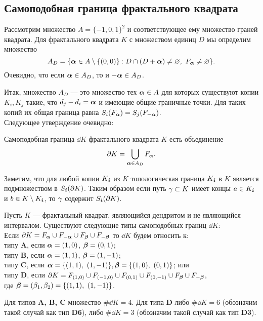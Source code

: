 \subsection{Самоподобная граница фрактального квадрата}

Рассмотрим множество $A=\{-1,0,1\}^2$ и соответствующее ему множество граней квадрата. 
Для фрактального квадрата $K$ с множеством единиц $D$ мы определим множество 
$$A_D=\{{\bm{\alpha}}\in A\setminus\{(0,0)\}: D\cap(D+{\bm{\alpha}})\neq\varnothing,\ F_{\bm{\alpha}}\neq\varnothing\}.$$ 
Очевидно, что если ${\bm{\alpha}}\in A_D$, то и $-{\bm{\alpha}}\in A_D$.

Итак, множество $A_D$ --- это множество тех ${\bm{\alpha}}\in A$ для которых существуют копии $K_i, K_j$ такие, что $d_j-d_i={\bm{\alpha}}$ и имеющие общие граничные точки. 
Для таких копий их общая граница равна $S_i(F_{\bm{\alpha}})=S_j(F_{-{\bm{\alpha}}})$.\\

Следующее утверждение очевидно:

\begin{proposition}\label{prop:dd}
Самоподобная граница $\dd K$ фрактального квадрата $K$ есть объединение
\begin{equation}
 \partial K=\bigcup\limits_{{\bm{\alpha}}\in A_D}F_{\bm{\alpha}}.
\end{equation}
\end{proposition}

Заметим, что для любой копии $K_{\bm{i}}$ из $K$ топологическая граница $K_{\bm{i}}$ в $K$ является подмножеством в 
$S_{\bm{i}}(\partial K)$. 
Таким образом если путь $\gamma\subset K$ имеет концы $a\in K_{\bm{i}}$ и $b\in K\setminus K_{\bm{i}}$, то $\gamma$ содержит $S_{\bm{i}}(\partial K)$.

\begin{theorem}\label{ssboundary}
Пусть $K$ --- фрактальный квадрат, являющийся дендритом и не являющийся интервалом. 
Существуют следующие типы самоподобных границ $\dd K$:\\
Если $\partial K=F_{\bm{\alpha}}\cup F_{-{\bm{\alpha}}}\cup F_{\bm{\beta}}\cup F_{-{\bm{\beta}}}$ то $\dd K$ будем относить к:\\
типу {\bf A}, если ${\bm{\alpha}}=(1,0)$, $ {\bm{\beta}}=(0,1)$;\\ 
типу {\bf B}, если ${\bm{\alpha}}=(1,1)$, $ {\bm{\beta}}=(1,-1)$; \\
типу {\bf C}, если $\bma=\{(1,1),\ (1,-1)\},\bmb=\{(1,0),\ (0,1)\}$; или\\
типу {\bf D}, если $\partial K=F_{(1,0)}\cup F_{(-1,0)}\cup F_{(0,1)}\cup F_{(0,-1)}\cup F_{\bm{\beta}}\cup F_{-{\bm{\beta}}}$,\\ 
где $\bmb=(\be_1,\be_2)=\{(1,1),\ (1,-1)\}$.
 
Для типов {\bf A, B, C} множество $\#\dd K=4$. 
Для типа {\bf D} либо $\#\dd K=6$ (обозначим такой случай как тип {\bf D6}), либо $\#\dd K=3$ (обозначим такой случай как тип {\bf D3}).
\end{theorem}

